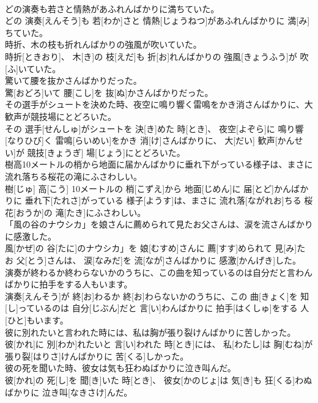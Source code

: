 \documentclass[8pt]{extreport}
\begin{document}
\begin{CJK}{UTF8}{min}
\\	どの演奏も若さと情熱があふれんばかりに満ちていた。	
\\	どの 演奏[えんそう]も 若[わか]さと 情熱[じょうねつ]があふれんばかりに 満[み]ちていた。
\\	時折、木の枝も折れんばかりの強風が吹いていた。	
\\	時折[ときおり]、 木[き]の 枝[えだ]も 折[お]れんばかりの 強風[きょうふう]が 吹[ふ]いていた。
\\	驚いて腰を抜かさんばかりだった。	
\\	驚[おどろ]いて 腰[こし]を 抜[ぬ]かさんばかりだった。
\\	その選手がシュートを決めた時、夜空に鳴り響く雷鳴をかき消さんばかりに、大歓声が競技場にとどろいた。	
\\	その 選手[せんしゅ]がシュートを 決[き]めた 時[とき]、 夜空[よぞら]に 鳴り響[なりひび]く 雷鳴[らいめい]をかき 消[け]さんばかりに、 大[だい] 歓声[かんせい]が 競技[きょうぎ] 場[じょう]にとどろいた。
\\	樹高10メートルの梢から地面に届かんばかりに垂れ下がっている様子は、まさに流れ落ちる桜花の滝にふさわしい。	
\\	樹[じゅ] 高[こう] 10メートルの 梢[こずえ]から 地面[じめん]に 届[とど]かんばかりに 垂れ下[たれさ]がっている 様子[ようす]は、まさに 流れ落[ながれお]ちる 桜花[おうか]の 滝[たき]にふさわしい。
\\	「風の谷のナウシカ」を娘さんに薦められて見たお父さんは、涙を流さんばかりに感激した。	
\\	風[かぜ]の 谷[たに]のナウシカ」を 娘[むすめ]さんに 薦[すす]められて 見[み]たお 父[とう]さんは、 涙[なみだ]を 流[なが]さんばかりに 感激[かんげき]した。
\\	演奏が終わるか終わらないかのうちに、この曲を知っているのは自分だと言わんばかりに拍手をする人もいます。	
\\	演奏[えんそう]が 終[お]わるか 終[お]わらないかのうちに、この 曲[きょく]を 知[し]っているのは 自分[じぶん]だと 言[い]わんばかりに 拍手[はくしゅ]をする 人[ひと]もいます。
\\	彼に別れたいと言われた時には、私は胸が張り裂けんばかりに苦しかった。	
\\	彼[かれ]に 別[わか]れたいと 言[い]われた 時[とき]には、 私[わたし]は 胸[むね]が 張り裂[はりさ]けんばかりに 苦[くる]しかった。
\\	彼の死を聞いた時、彼女は気も狂わぬばかりに泣き叫んだ。	
\\	彼[かれ]の 死[し]を 聞[き]いた 時[とき]、 彼女[かのじょ]は 気[き]も 狂[くる]わぬばかりに 泣き叫[なきさけ]んだ。

\end{CJK}
\end{document}
